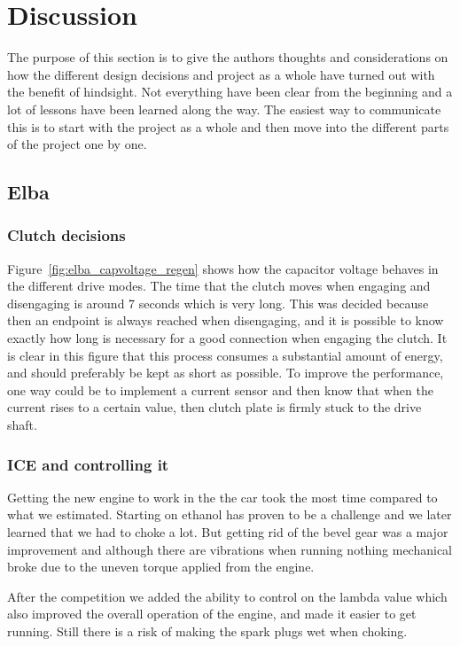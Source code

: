 \chapter{Discussion}
The purpose of this section is to give the authors thoughts and considerations
on how the different design decisions and project as a whole have turned out
with the benefit of hindsight. Not everything have been clear from the beginning
and a lot of lessons have been learned along the way. The easiest way to
communicate this is to start with the project as a whole and then move into the
different parts of the project one by one. 

\section{Elba}
\subsection{Clutch decisions}
Figure~\ref{fig:elba_capvoltage_regen} shows how the capacitor voltage behaves in the different drive modes.
The time that the clutch moves when engaging and disengaging is around 7 seconds which is very long. This was decided because then an endpoint is always reached when disengaging, and it is possible to know exactly how long is necessary 
for a good connection when engaging the clutch. It is clear in this figure that this process consumes a substantial 
amount of energy, and should preferably be kept as short as possible. To improve the performance, one way could be to implement a current sensor and then know that when the current rises to a certain value, then clutch plate is firmly stuck to the drive shaft.

\subsection{ICE and controlling it}
Getting the new engine to work in the the car took the most time compared to what we estimated. Starting on ethanol has proven to be a challenge and we later learned that we had to choke a lot. But getting rid of the bevel gear was a major improvement and although there are vibrations when running nothing mechanical broke due to the uneven torque applied from the engine. 

After the competition we added the ability to control on the lambda value which also improved the overall operation of the engine, and made it easier to get running. Still there is a risk of making the spark plugs wet when choking. 

